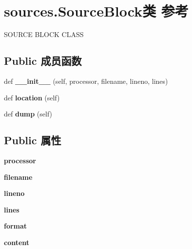 \hypertarget{classsources_1_1_source_block}{}\section{sources.\+Source\+Block类 参考}
\label{classsources_1_1_source_block}


S\+O\+U\+R\+CE B\+L\+O\+CK C\+L\+A\+SS  


\subsection*{Public 成员函数}
\begin{DoxyCompactItemize}
\item 
\mbox{\label{classsources_1_1_source_block_a2b9e38624d6465405176b7ddd22c85de}} 
def {\bfseries \+\_\+\+\_\+init\+\_\+\+\_\+} (self, processor, filename, lineno, lines)
\item 
\mbox{\label{classsources_1_1_source_block_a1e005be6a494646c29d44f36900b522c}} 
def {\bfseries location} (self)
\item 
\mbox{\label{classsources_1_1_source_block_a9e8e2023c9e5b856a60680678ee732e1}} 
def {\bfseries dump} (self)
\end{DoxyCompactItemize}
\subsection*{Public 属性}
\begin{DoxyCompactItemize}
\item 
\mbox{\label{classsources_1_1_source_block_a8959c6541c8fe51ec6111dd80973805b}} 
{\bfseries processor}
\item 
\mbox{\label{classsources_1_1_source_block_a8c6429cc014b529c83008381c3628802}} 
{\bfseries filename}
\item 
\mbox{\label{classsources_1_1_source_block_ad5abe697abb489da39fcf1ada5cc0cc3}} 
{\bfseries lineno}
\item 
\mbox{\label{classsources_1_1_source_block_aebcb48dd1532e4dbe6ef18ff839dd1e6}} 
{\bfseries lines}
\item 
\mbox{\label{classsources_1_1_source_block_a841a9b75f5efd9649d0e86c1072ed65d}} 
{\bfseries format}
\item 
\mbox{\label{classsources_1_1_source_block_a3f9e3b90ee957c6d8fc8f326d05c7e3b}} 
{\bfseries content}
\end{DoxyCompactItemize}


